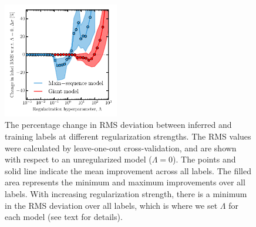 \documentclass[preprint,trackchanges]{aastex}
\begin{document}
\begin{figure}[p]
\center
\includegraphics[width=0.45\textwidth]{figures/set-hyperparameters.pdf}
\caption{The percentage change in RMS deviation between inferred and training labels at different regularization strengths.  The RMS values were calculated by leave-one-out cross-validation, and are shown with respect to an unregularized model ($\Lambda = 0$).  The points and solid line indicate the mean improvement across all labels. The filled area represents the minimum and maximum improvements over all labels. With increasing regularization strength, there is a minimum in the RMS deviation over all labels, which is where we set $\Lambda$ for each model (see text for details).\label{fig:set-hyperparameters}}
\end{figure}
\end{document}
